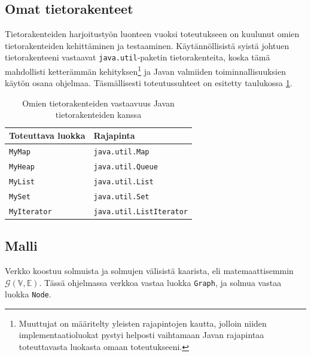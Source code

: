 \documentclass[10pt,a4paper]{article}
\begin{document}
\subsection{Omat tietorakenteet}
\label{datastructures}

Tietorakenteiden harjoitustyön luonteen vuoksi toteutukseen on kuulunut omien tietorakenteiden kehittäminen ja testaaminen. Käytännöllisistä syistä johtuen tietorakenteeni vastaavat \texttt{java.util}-paketin tietorakenteita, koska tämä mahdollisti ketterämmän kehityksen\footnote{Muuttujat on määritelty yleisten rajapintojen kautta, jolloin niiden implementaatioluokat pystyi helposti vaihtamaan Javan rajapintaa toteuttavasta luokasta omaan toteutukseeni.} ja Javan valmiiden toiminnallisuuksien käytön osana ohjelmaa. Täsmällisesti toteutussuhteet on esitetty taulukossa \ref{omat_tietorakenteet}.

\begin{table}

\begin{tabular}{l|l}
Toteuttava luokka & Rajapinta \\ 
\hline 
\texttt{MyMap} & \texttt{java.util.Map} \\
\texttt{MyHeap} & \texttt{java.util.Queue} \\ 
\texttt{MyList} & \texttt{java.util.List} \\ 
\texttt{MySet} & \texttt{java.util.Set} \\ 
\texttt{MyIterator} & \texttt{java.util.ListIterator} \\ 
\end{tabular} 

\caption{Omien tietorakenteiden vastaavuus Javan tietorakenteiden kanssa}
\label{omat_tietorakenteet}
\end{table}

\subsection{Malli}
\label{model.graph}

Verkko koostuu solmuista ja solmujen välisistä kaarista, eli matemaattisemmin $\mathcal{G}( \mathbb{V}, \mathbb{E})$. Tässä ohjelmassa verkkoa vastaa luokka \texttt{Graph}, ja solmua vastaa luokka \texttt{Node}.
\end{document}
